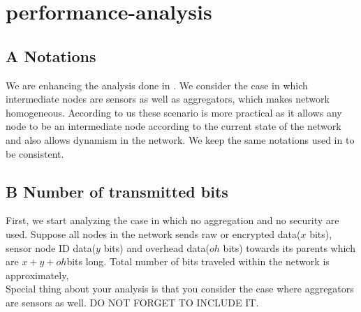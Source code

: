 \chapter{performance-analysis}

\section{ A Notations }
	We are enhancing the analysis done in \cite{alzaid2008secure}.
	We consider the case in which intermediate nodes are sensors as well as aggregators, which makes network homogeneous. 
	According to us these scenario is more practical as it allows any node to be an intermediate node  according to the current state of the network and also allows dynamism in the network. We keep the same notations used in \cite{alzaid2008secure} to be consistent.

\section {B Number of transmitted bits}
	First, we start analyzing the case in which no aggregation and no security are used.
	Suppose all nodes in the network sends raw or encrypted data($x$ bits), sensor node ID data($y$ bits) and overhead data($oh$ bits) towards its parents which are $x+y+oh$bits long.
	Total number of bits traveled within the network is approximately, 
	\begin{equation}
				
	\end{equation}
	Special thing about your analysis is that you consider the case where aggregators are sensors as well. DO NOT FORGET TO INCLUDE IT.
